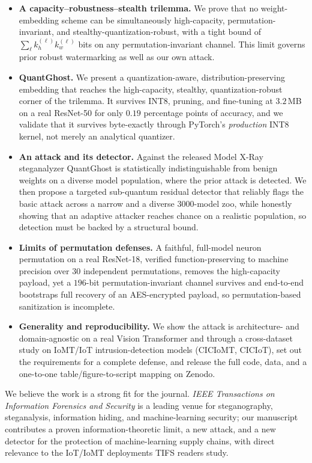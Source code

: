 \documentclass[11pt]{article}
\begin{document}
\begin{itemize}
\item \textbf{A capacity--robustness--stealth trilemma.} We prove that no
  weight-embedding scheme can be simultaneously high-capacity, permutation-invariant,
  and stealthy-quantization-robust, with a tight bound of $\sum_\ell k_h^{(\ell)}
  k_w^{(\ell)}$ bits on any permutation-invariant channel. This limit governs prior
  robust watermarking as well as our own attack.
\item \textbf{QuantGhost.} We present a quantization-aware, distribution-preserving
  embedding that reaches the high-capacity, stealthy, quantization-robust corner of the
  trilemma. It survives INT8, pruning, and fine-tuning at $3.2$\,MB on a real ResNet-50
  for only $0.19$ percentage points of accuracy, and we validate that it survives
  byte-exactly through PyTorch's \emph{production} INT8 kernel, not merely an analytical
  quantizer.
\item \textbf{An attack and its detector.} Against the released Model X-Ray steganalyzer
  QuantGhost is statistically indistinguishable from benign weights on a diverse model
  population, where the prior attack is detected. We then propose a targeted sub-quantum
  residual detector that reliably flags the basic attack across a narrow and a diverse
  $3000$-model zoo, while honestly showing that an adaptive attacker reaches chance on a
  realistic population, so detection must be backed by a structural bound.
\item \textbf{Limits of permutation defenses.} A faithful, full-model neuron permutation
  on a real ResNet-18, verified function-preserving to machine precision over $30$
  independent permutations, removes the high-capacity payload, yet a $196$-bit
  permutation-invariant channel survives and end-to-end bootstraps full recovery of an
  AES-encrypted payload, so permutation-based sanitization is incomplete.
\item \textbf{Generality and reproducibility.} We show the attack is architecture- and
  domain-agnostic on a real Vision Transformer and through a cross-dataset study on
  IoMT/IoT intrusion-detection models (CICIoMT, CICIoT), set out the requirements for a
  complete defense, and release the full code, data, and a one-to-one table/figure-to-script
  mapping on Zenodo.
\end{itemize}

We believe the work is a strong fit for the journal. \emph{IEEE Transactions on
Information Forensics and Security} is a leading venue for steganography, steganalysis,
information hiding, and machine-learning security; our manuscript contributes a proven
information-theoretic limit, a new attack, and a new detector for the protection of
machine-learning supply chains, with direct relevance to the IoT/IoMT deployments TIFS
readers study.
\end{document}
